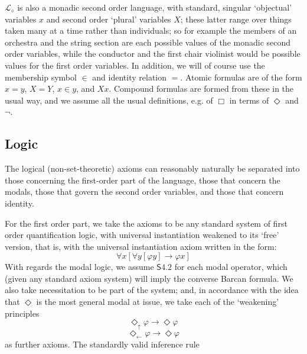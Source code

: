 \documentclass{article}
\theoremstyle{definition}
\newcommand{\du}{\Diamond_\uparrow}
\newcommand{\dl}{\Diamond_\leftarrow}
\begin{document}
$\mathcal{L}_\diamond$ is also a monadic second order language, 
with standard, singular `objectual' variables $x$ 
and second order `plural' variables $X$; these latter range over things taken many at 
a time rather than individuals; so for example the members of an orchestra and the string 
section are each possible values of the monadic second order variables, while the conductor 
and the first chair violinist would be possible values for the first order variables. 
In addition, we will of course use the membership symbol $\in$ and identity relation
$=$. Atomic formulas are of the form $x = y$, $X = Y$, $x \in y$, and $Xx$. Compound 
formulas are formed from these in the usual way, and we assume all the usual definitions,
e.g. of $\Box$ in terms of $\Diamond$ and $\neg$.
\subsection{Logic}
The logical (non-set-theoretic) axioms can reasonably naturally be separated 
into those concerning the first-order part of the language, those that concern 
the modals, those that govern the second order variables, 
and those that concern identity.

For the first order part, we take the axioms to be any standard system of first
order quantification logic, with universal instantiation weakened to its `free'
version, that is, with the universal instantiation axiom written in the form: 
\begin{equation}
    \forall x [\forall y [ \varphi y] \rightarrow \varphi x]
\end{equation}
With regards the modal logic, we assume $\mathsf{S4.2}$ for each modal operator,
which (given any standard axiom system) will imply the converse Barcan formula. 
We also take necessitation to be part of the system; and, in 
accordance with the idea that $\Diamond$ is the most general modal at issue, we take 
each of the `weakening' principles
\begin{equation}
    \du \varphi \rightarrow \Diamond \varphi
\end{equation}
\begin{equation}
    \dl \varphi \rightarrow \Diamond \varphi
\end{equation}
as further axioms.
The standardly valid inference rule 
\begin{prooftree}
\end{prooftree}
\end{document}
